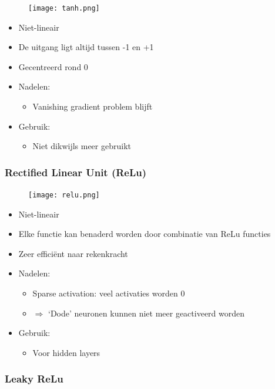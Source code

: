 \documentclass{article}
\begin{document}
\begin{figure}[H]
    \centering
    \texttt{[image: tanh.png]}
\end{figure}


\begin{itemize}
    \item Niet-lineair
    \item De uitgang ligt altijd tussen -1 en +1
    \item Gecentreerd rond 0
    \item Nadelen:
    \begin{itemize}
        \item Vanishing gradient problem blijft
    \end{itemize}
    \item Gebruik:
    \begin{itemize}
        \item Niet dikwijls meer gebruikt
    \end{itemize}
\end{itemize}

\subsubsection{Rectified Linear Unit (ReLu)}

\begin{figure}[H]
    \centering
    \texttt{[image: relu.png]}
\end{figure}

\begin{itemize}
    \item Niet-lineair
    \item Elke functie kan benaderd worden door combinatie van ReLu functies
    \item Zeer efficiënt naar rekenkracht
    \item Nadelen:
    \begin{itemize}
        \item Sparse activation: veel activaties worden 0
        \item $\Rightarrow$ `Dode' neuronen kunnen niet meer geactiveerd worden
    \end{itemize}
    \item Gebruik:
    \begin{itemize}
        \item Voor hidden layers
    \end{itemize}
\end{itemize}


\subsubsection{Leaky ReLu}
\end{document}
